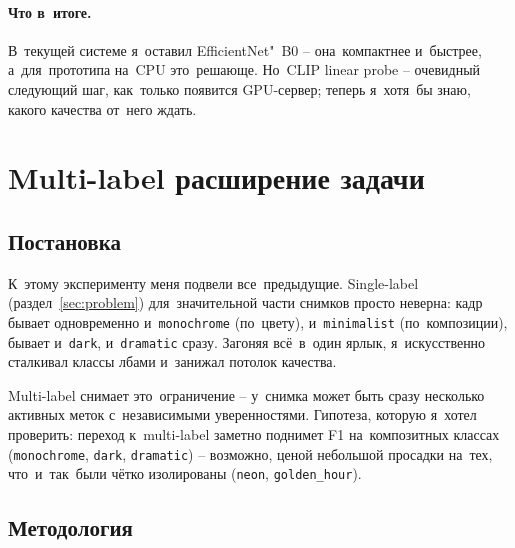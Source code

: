 \documentclass[a4paper,12pt]{diplom}
\begin{document}
\paragraph{Что в~итоге.} В~текущей системе я~оставил EfficientNet"~B0 -- она~компактнее и~быстрее, а~для~прототипа на~CPU это~решающе. Но~CLIP linear probe -- очевидный следующий шаг, как~только появится GPU-сервер; теперь я~хотя~бы знаю, какого качества от~него ждать.

\section{Multi-label расширение задачи}
\label{sec:multilabel}

\subsection{Постановка}

К~этому эксперименту меня подвели все~предыдущие. Single-label (раздел~\ref{sec:problem}) для~значительной части снимков просто неверна: кадр бывает одновременно и~\texttt{monochrome} (по~цвету), и~\texttt{minimalist} (по~композиции), бывает и~\texttt{dark}, и~\texttt{dramatic} сразу. Загоняя всё~в~один ярлык, я~искусственно сталкивал классы лбами и~занижал потолок качества.

Multi-label снимает это~ограничение -- у~снимка может быть сразу несколько активных меток с~независимыми уверенностями. Гипотеза, которую я~хотел проверить: переход к~multi-label заметно поднимет F1 на~композитных классах (\texttt{monochrome}, \texttt{dark}, \texttt{dramatic}) -- возможно, ценой небольшой просадки на~тех, что~и~так~были чётко изолированы (\texttt{neon}, \texttt{golden\_hour}).

\subsection{Методология}
\end{document}
